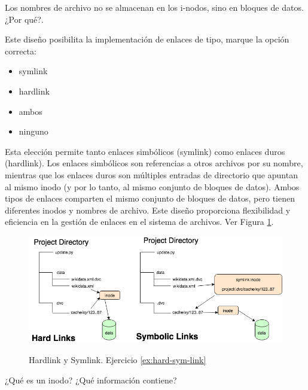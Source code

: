 \documentclass[../main.tex]{subfiles}
\begin{document}
    \begin{exercise}
        Los nombres de archivo no se almacenan en los i-nodos, sino en bloques de datos. ¿Por qué?.

        Este diseño posibilita la implementación de enlaces de tipo, marque la opción correcta:
        \begin{itemize}
            \item symlink
            \item hardlink
            \item ambos \checkmark
            \item ninguno  
        \end{itemize}

        \begin{answer}
            Esta elección permite tanto enlaces simbólicos (symlink) como enlaces duros (hardlink). Los enlaces simbólicos son referencias a otros archivos por su nombre, mientras que los enlaces duros son múltiples entradas de directorio que apuntan al mismo inodo (y por lo tanto, al mismo conjunto de bloques de datos). Ambos tipos de enlaces comparten el mismo conjunto de bloques de datos, pero tienen diferentes inodos y nombres de archivo. Este diseño proporciona flexibilidad y eficiencia en la gestión de enlaces en el sistema de archivos. Ver Figura \ref{fig:hard-sym-link}.
        \end{answer}
        \label{ex:hard-sym-link}
    \end{exercise}

    \begin{figure}[ht]
        \centering
        \includegraphics[scale=0.45]{../images/hard-sym-link.png}
        \label{fig:hard-sym-link}
        \caption{Hardlink y Symlink. Ejercicio \ref{ex:hard-sym-link}}
    \end{figure}

    \begin{exercise}
        ¿Qué es un inodo? ¿Qué información contiene?
    \end{exercise}
\end{document}
